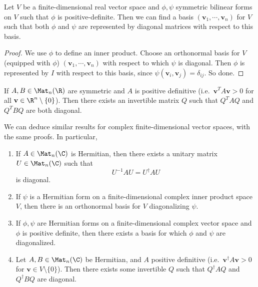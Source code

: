 \documentclass[a4paper]{article}
\begin{document}
\begin{cor}
  Let $V$ be a finite-dimensional real vector space and $\phi, \psi$ symmetric bilinear forms on $V$ such that $\phi$ is positive-definite. Then we can find a basis $(\mathbf{v}_1, \cdots, \mathbf{v}_n)$ for $V$ such that both $\phi$ and $\psi$ are represented by diagonal matrices with respect to this basis.
\end{cor}

\begin{proof}
  We use $\phi$ to define an inner product. Choose an orthonormal basis for $V$ (equipped with $\phi$) $(\mathbf{v}_1, \cdots, \mathbf{v}_n)$ with respect to which $\psi$ is diagonal. Then $\phi$ is represented by $I$ with respect to this basis, since $\psi(\mathbf{v}_i, \mathbf{v}_j) = \delta_{ij}$. So done.
\end{proof}

\begin{cor}
  If $A, B \in \Mat_n(\R)$ are symmetric and $A$ is positive definitive (i.e.\ $\mathbf{v}^T A \mathbf{v} > 0$ for all $\mathbf{v} \in \R^n \setminus \{0\}$). Then there exists an invertible matrix $Q$ such that $Q^T AQ$ and $Q^T BQ$ are both diagonal.
\end{cor}

We can deduce similar results for complex finite-dimensional vector spaces, with the same proofs. In particular,
\begin{prop}\leavevmode
  \begin{enumerate}
    \item If $A \in \Mat_n(\C)$ is Hermitian, then there exists a unitary matrix $U \in \Mat_n(\C)$ such that
      \[
        U^{-1}AU = U^\dagger AU
      \]
      is diagonal.
    \item If $\psi$ is a Hermitian form on a finite-dimensional complex inner product space $V$, then there is an orthonormal basis for $V$ diagonalizing $\psi$.
    \item If $\phi, \psi$ are Hermitian forms on a finite-dimensional complex vector space and $\phi$ is positive definite, then there exists a basis for which $\phi$ and $\psi$ are diagonalized.
    \item Let $A, B \in \Mat_n(\C)$ be Hermitian, and $A$ positive definitive (i.e.\ $\mathbf{v}^\dagger A \mathbf{v} > 0$ for $\mathbf{v} \in V \setminus \{0\}$). Then there exists some invertible $Q$ such that $Q^\dagger AQ$ and $Q^\dagger BQ$ are diagonal.
  \end{enumerate}
\end{prop}
\end{document}
